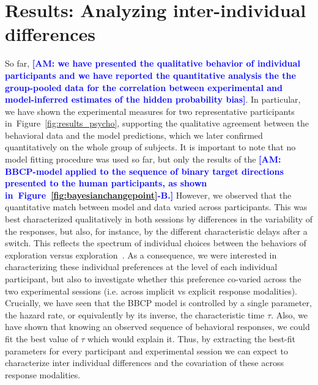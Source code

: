 \documentclass[12pt,english]{article}%
\newcommand{\citep}[1]{\parencite{#1}}
\newcommand{\seeFig}[1]{Figure~\ref{fig:#1}}
\newcommand{\AM}[1]{\textbf{\textcolor{blue}{[AM: #1]}}}
\begin{document}
\section{Results: Analyzing inter-individual differences}
\label{sec:inter}
So far, \AM{we have presented the qualitative behavior of individual participants and we have reported the quantitative analysis the the group-pooled data for the correlation between experimental and model-inferred estimates of the hidden probability bias}.
In particular, we have shown the experimental measures for two representative participants in~\seeFig{results_psycho},
supporting the qualitative agreement between the behavioral data and the model predictions, 
which we later confirmed quantitatively on the whole group of subjects.
It is important to note that no model fitting procedure was used so far,
but only the results of the \AM{BBCP-model applied to the sequence of binary target directions presented to the human participants, as shown in~\seeFig{bayesianchangepoint}-B.}
However, we observed that the quantitative match between model and data varied across participants.
This was best characterized qualitatively in both sessions by differences
in the variability of the responses, but also, for instance,
by the different characteristic delays after a switch.
This reflects the spectrum of individual choices
between the behaviors of exploration versus exploration~\citep{Behrens07}.
As a consequence, we were interested in characterizing these individual preferences
at the level of each individual participant, but also to investigate
whether this preference co-varied across the two experimental sessions (i.e. across implicit vs explicit response modalities).
Crucially, we have seen that the BBCP model is controlled by a single parameter,
the hazard rate, or equivalently by its inverse, the characteristic time $\tau$.
Also, we have shown that knowing an observed sequence of behavioral responses,
we could fit the best value of $\tau$ which would explain it.
Thus, by extracting the best-fit parameters for every participant and experimental session
we can expect to characterize inter individual differences and the covariation of these across response modalities.
\end{document}
